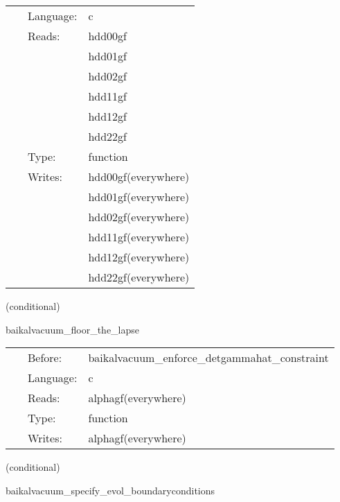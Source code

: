  \begin{tabular*}{160mm}{cll} 
~ & Language:  & c \\ 
~ & Reads:  & hdd00gf \\ 
~& ~ &hdd01gf\\ 
~& ~ &hdd02gf\\ 
~& ~ &hdd11gf\\ 
~& ~ &hdd12gf\\ 
~& ~ &hdd22gf\\ 
~ & Type:  & function \\ 
~ & Writes:  & hdd00gf(everywhere) \\ 
~& ~ &hdd01gf(everywhere)\\ 
~& ~ &hdd02gf(everywhere)\\ 
~& ~ &hdd11gf(everywhere)\\ 
~& ~ &hdd12gf(everywhere)\\ 
~& ~ &hdd22gf(everywhere)\\ 
\end{tabular*} 


\vspace{5mm}

   (conditional) 

\hspace{5mm} baikalvacuum\_floor\_the\_lapse 

\hspace{5mm}{\it set lapse = max(lapse\_floor, lapse) } 


\hspace{5mm}

 \begin{tabular*}{160mm}{cll} 
~ & Before:  & baikalvacuum\_enforce\_detgammahat\_constraint \\ 
~ & Language:  & c \\ 
~ & Reads:  & alphagf(everywhere) \\ 
~ & Type:  & function \\ 
~ & Writes:  & alphagf(everywhere) \\ 
\end{tabular*} 


\vspace{5mm}

   (conditional) 

\hspace{5mm} baikalvacuum\_specify\_evol\_boundaryconditions 

\hspace{5mm}{\it register boundary conditions and perform amr+interprocessor synchronization } 


